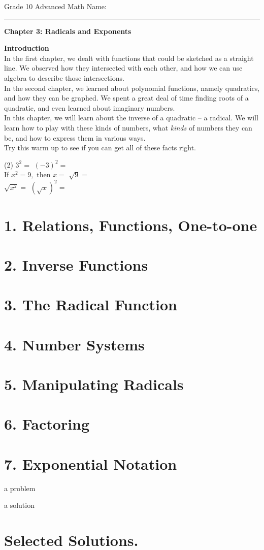 \documentclass[12pt,fleqn]{book}
\newcommand{\prb}[1]{\begin{Exercise}#1\end{Exercise}}
\newcommand{\sol}[1]{\begin{Answer}#1\end{Answer}}
\begin{document}
\noindent
\thispagestyle{empty}
Grade 10 Advanced Math \hfill Name: \hspace{2in}
\medskip\hrule
\noindent

\vfill

\begin{center}
	{\bf \huge Chapter 3: Radicals and Exponents}
\end{center}

\vfill
\vfill

\clearpage

\setcounter{page}{1}

{\bf \huge Introduction }
\\[1in]
In the first chapter, we dealt with functions that could be sketched as a straight line.  We observed how they intersected with each other, and how we can use algebra to describe those intersections.
\\[1em]
In the second chapter, we learned about polynomial functions, namely quadratics, and how they can be graphed.  We spent a great deal of time finding roots of a quadratic, and even learned about imaginary numbers.
\\[1em]
In this chapter, we will learn about the inverse of a quadratic -- a radical.  We will learn how to play with these kinds of numbers, what \emph{kinds} of numbers they can be, and how to express them in various ways.
\\[1em]
Try this warm up to see if you can get all of these facts right.
\begin{tasks}(2)
    \task $3^2=$
    \task $(-3)^2=$
    \\[1em]
    \task If $x^2=9,$ then $x=$
    \task $\sqrt 9 =$
    \\[1em]
    \task $\sqrt{x^2}=$
    \task $(\sqrt x)^2=$
\end{tasks}
\clearpage
\chapter{1. Relations, Functions, One-to-one}
\chapter{2. Inverse Functions}
\chapter{3. The Radical Function}
\chapter{4. Number Systems}
\chapter{5. Manipulating Radicals}
\chapter{6. Factoring}
\chapter{7. Exponential Notation}
\prb{a problem}
\sol{a solution}
\chapter{Selected Solutions.}
\shipoutAnswer
\end{document}

